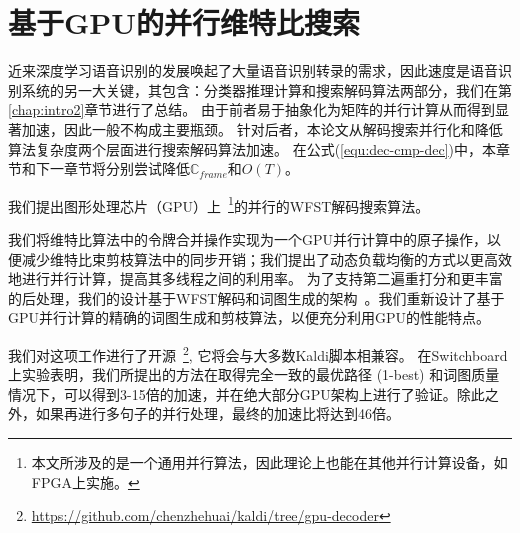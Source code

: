 
\chapter{基于GPU的并行维特比搜索}
\label{chap:gpu}

近来深度学习语音识别的发展唤起了大量语音识别转录的需求，因此速度是语音识别系统的另一大关键，其包含：分类器推理计算和搜索解码算法两部分，我们在第\ref{chap:intro2}章节进行了总结。
由于前者易于抽象化为矩阵的并行计算从而得到显著加速，因此一般不构成主要瓶颈。
%
针对后者，本论文从解码搜索并行化和降低算法复杂度两个层面进行搜索解码算法加速。
在公式(\ref{equ:dec-cmp-dec})中，本章节和下一章节将分别尝试降低$\mathbb{C}_{frame}$和$O(T)$。

我们提出图形处理芯片（GPU）上~\footnote{本文所涉及的是一个通用并行算法，因此理论上也能在其他并行计算设备，如FPGA上实施。}的并行的WFST解码搜索算法。%
%

我们将维特比算法中的令牌合并操作实现为一个GPU并行计算中的原子操作，以便减少维特比束剪枝算法中的同步开销；我们提出了动态负载均衡的方式以更高效地进行并行计算，提高其多线程之间的利用率。
为了支持第二遍重打分和更丰富的后处理，我们的设计基于WFST解码和词图生成的架构~\cite{povey2012generating}。我们重新设计了基于GPU并行计算的精确的词图生成和剪枝算法，以便充分利用GPU的性能特点。

我们对这项工作进行了开源~\footnote{\url{https://github.com/chenzhehuai/kaldi/tree/gpu-decoder}},
它将会与大多数Kaldi脚本相兼容。
%
在Switchboard 上实验表明，我们所提出的方法在取得完全一致的最优路径 (1-best) 和词图质量情况下，可以得到3-15倍的加速，并在绝大部分GPU架构上进行了验证。除此之外，如果再进行多句子的并行处理，最终的加速比将达到46倍。


%





